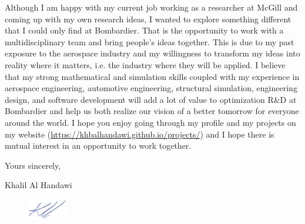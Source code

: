 \documentclass[12pt]{article} %
\begin{document}
\medskip %

Although I am happy with my current job working as a researcher at McGill and coming up with my own research ideas, I wanted to explore something different that I could only find at Bombardier. That is the opportunity to work with a multidisciplinary team and bring people's ideas together. This is due to my past exposure to the aerospace industry and my willingness to transform my ideas into reality where it matters, i.e. the industry where they will be applied. I believe that my strong mathematical and simulation skills coupled with my experience in aerospace engineering, automotive engineering, structural simulation, engineering design, and software development will add a lot of value to optimization R\&D at Bombardier and help us both realize our vision of a better tomorrow for everyone around the world. I hope you enjoy going through my profile and my projects on my website (\href{https://khbalhandawi.github.io/projects/}{https://khbalhandawi.github.io/projects/}) and I hope there is mutual interest in an opportunity to work together.

\medskip %

Yours sincerely,

\medskip %

Khalil Al Handawi

\begin{figure}[h]
	\includegraphics[width=0.15\textwidth]{Signiture.png}
\end{figure}

\medskip %

\end{document}
